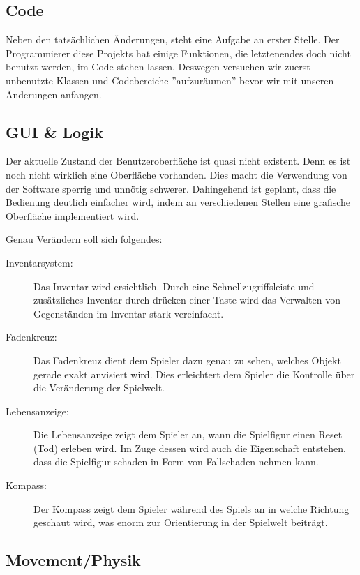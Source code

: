 \documentclass{article}
\begin{document}
\subsection{Code}

Neben den tatsächlichen Änderungen, steht eine Aufgabe an erster Stelle. Der Programmierer diese Projekts hat einige Funktionen, die letztenendes doch nicht benutzt werden, im Code stehen lassen. Deswegen versuchen wir zuerst unbenutzte Klassen und Codebereiche ''aufzuräumen'' bevor wir mit unseren Änderungen anfangen.

\subsection{GUI \& Logik}

Der aktuelle Zustand der Benutzeroberfläche ist quasi nicht existent. Denn es ist noch nicht wirklich eine Oberfläche vorhanden. Dies macht die Verwendung von der Software sperrig und unnötig schwerer. Dahingehend ist geplant, dass die Bedienung deutlich einfacher wird, indem an verschiedenen Stellen eine grafische Oberfläche implementiert wird.

Genau Verändern soll sich folgendes:

\begin{description}
  \item[Inventarsystem:] Das Inventar wird ersichtlich. Durch eine Schnellzugriffsleiste und zusätzliches Inventar durch drücken einer Taste wird das Verwalten von Gegenständen im Inventar stark vereinfacht.
  \item[Fadenkreuz:] Das Fadenkreuz dient dem Spieler dazu genau zu sehen, welches Objekt gerade exakt anvisiert wird. Dies erleichtert dem Spieler die Kontrolle über die Veränderung der Spielwelt.
  \item[Lebensanzeige:] Die Lebensanzeige zeigt dem Spieler an, wann die Spielfigur einen Reset (Tod) erleben wird. Im Zuge dessen wird auch die Eigenschaft entstehen, dass die Spielfigur schaden in Form von Fallschaden nehmen kann.
  \item[Kompass:] Der Kompass zeigt dem Spieler während des Spiels an in welche Richtung geschaut wird, was enorm zur Orientierung in der Spielwelt beiträgt.
\end{description}

\subsection{Movement/Physik}
\end{document}
